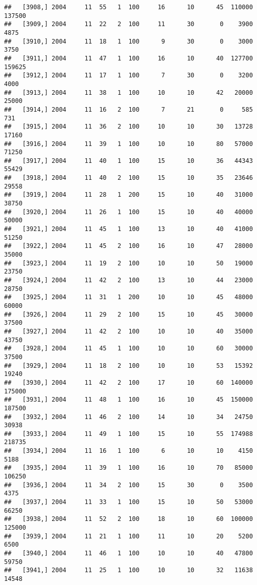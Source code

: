 \documentclass{article}\usepackage[]{graphicx}\usepackage[]{color}
\makeatletter
\newenvironment{kframe}{%
 \def\at@end@of@kframe{}%
 \ifinner\ifhmode%
  \def\at@end@of@kframe{\end{minipage}}%
  \begin{minipage}{\columnwidth}%
 \fi\fi%
 \def\FrameCommand##1{\hskip\@totalleftmargin \hskip-\fboxsep
 \colorbox{shadecolor}{##1}\hskip-\fboxsep
     \hskip-\linewidth \hskip-\@totalleftmargin \hskip\columnwidth}%
 \MakeFramed {\advance\hsize-\width
   \@totalleftmargin\z@ \linewidth\hsize
   \@setminipage}}%
 {\par\unskip\endMakeFramed%
 \at@end@of@kframe}
\newenvironment{knitrout}{}{} %
\makeatother
\begin{document}
\begin{knitrout}
\begin{kframe}
\begin{verbatim}
##   [3908,] 2004     11  55   1  100     16      10      45  110000  137500
##   [3909,] 2004     11  22   2  100     11      30       0    3900    4875
##   [3910,] 2004     11  18   1  100      9      30       0    3000    3750
##   [3911,] 2004     11  47   1  100     16      10      40  127700  159625
##   [3912,] 2004     11  17   1  100      7      30       0    3200    4000
##   [3913,] 2004     11  38   1  100     10      10      42   20000   25000
##   [3914,] 2004     11  16   2  100      7      21       0     585     731
##   [3915,] 2004     11  36   2  100     10      10      30   13728   17160
##   [3916,] 2004     11  39   1  100     10      10      80   57000   71250
##   [3917,] 2004     11  40   1  100     15      10      36   44343   55429
##   [3918,] 2004     11  40   2  100     15      10      35   23646   29558
##   [3919,] 2004     11  28   1  200     15      10      40   31000   38750
##   [3920,] 2004     11  26   1  100     15      10      40   40000   50000
##   [3921,] 2004     11  45   1  100     13      10      40   41000   51250
##   [3922,] 2004     11  45   2  100     16      10      47   28000   35000
##   [3923,] 2004     11  19   2  100     10      10      50   19000   23750
##   [3924,] 2004     11  42   2  100     13      10      44   23000   28750
##   [3925,] 2004     11  31   1  200     10      10      45   48000   60000
##   [3926,] 2004     11  29   2  100     15      10      45   30000   37500
##   [3927,] 2004     11  42   2  100     10      10      40   35000   43750
##   [3928,] 2004     11  45   1  100     10      10      60   30000   37500
##   [3929,] 2004     11  18   2  100     10      10      53   15392   19240
##   [3930,] 2004     11  42   2  100     17      10      60  140000  175000
##   [3931,] 2004     11  48   1  100     16      10      45  150000  187500
##   [3932,] 2004     11  46   2  100     14      10      34   24750   30938
##   [3933,] 2004     11  49   1  100     15      10      55  174988  218735
##   [3934,] 2004     11  16   1  100      6      10      10    4150    5188
##   [3935,] 2004     11  39   1  100     16      10      70   85000  106250
##   [3936,] 2004     11  34   2  100     15      30       0    3500    4375
##   [3937,] 2004     11  33   1  100     15      10      50   53000   66250
##   [3938,] 2004     11  52   2  100     18      10      60  100000  125000
##   [3939,] 2004     11  21   1  100     11      10      20    5200    6500
##   [3940,] 2004     11  46   1  100     10      10      40   47800   59750
##   [3941,] 2004     11  25   1  100     10      10      32   11638   14548

\end{verbatim}
\end{kframe}
\end{knitrout}
\end{document}
